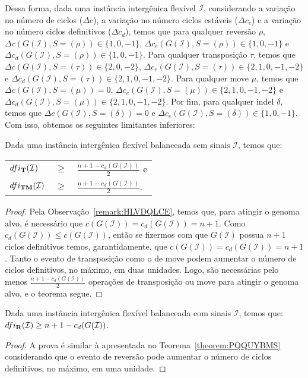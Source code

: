 Dessa forma, dada uma instância intergênica flexível $\mathcal{I}$, considerando a variação no número de ciclos ($\Delta c$), a variação no número ciclos estáveis ($\Delta c_e$) e a variação no número ciclos definitivos ($\Delta c_d$), temos que para qualquer reversão $\rho$, $\Delta c(G(\mathcal{I}), S=(\rho)) \in \{1,0,-1\}$, $\Delta c_e(G(\mathcal{I}), S=(\rho)) \in \{1,0,-1\}$ e $\Delta c_d(G(\mathcal{I}), S=(\rho)) \in \{1,0,-1\}$. Para qualquer transposição $\tau$, temos que $\Delta c(G(\mathcal{I}), S=(\tau)) \in \{2,0,-2\}$, $\Delta c_e(G(\mathcal{I}), S=(\tau)) \in \{2,1,0,-1,-2\}$ e $\Delta c_d(G(\mathcal{I}), S=(\tau)) \in \{2,1,0,-1,-2\}$. Para qualquer move $\mu$, temos que $\Delta c(G(\mathcal{I}), S=(\mu)) = 0$, $\Delta c_e(G(\mathcal{I}), S=(\mu)) \in \{2,1,0,-1,-2\}$ e $\Delta c_d(G(\mathcal{I}), S=(\mu)) \in \{2,1,0,-1,-2\}$. Por fim, para qualquer indel $\delta$, temos que $\Delta c(G(\mathcal{I}), S=(\delta)) = 0$ e $\Delta c_e(G(\mathcal{I}), S=(\delta)) \in \{1,0,{-1}\}$. Com isso, obtemos os seguintes limitantes inferiores:

\begin{theorem}\label{theorem:PQQUYBMS}
Dada uma instância intergênica flexível balanceada sem sinais $\mathcal{I}$, temos que:

\begin{tabular}{lll}
  $dfi_{\textbf{T}}(\mathcal{I})$      & $ \ge $ & $\frac{{n+1} - c_d(G(\mathcal{I} ))}{2}$ e \\
  $dfi_{\textbf{TM}}(\mathcal{I})$     & $ \ge $ & $\frac{{n+1} - c_d(G(\mathcal{I} ))}{2}$.  \\
\end{tabular}
\end{theorem}
\begin{proof}
Pela Observação~\ref{remark:HLVDQLCE}, temos que, para atingir o genoma alvo, é necessário que $c(G(\mathcal{I})) = c_d(G(\mathcal{I})) = n+1$. Como $c_d(G(\mathcal{I})) \le c(G(\mathcal{I}))$, então se fizermos com que $G(\mathcal{I})$ possua $n+1$ ciclos definitivos temos, garantidamente, que $c(G(\mathcal{I})) = c_d(G(\mathcal{I})) = n+1$. Tanto o evento de transposição como o de move podem aumentar o número de ciclos definitivos, no máximo, em duas unidades. Logo, são necessárias pelo menos $\frac{{n+1} - c_d(G(\mathcal{I} ))}{2}$ operações de transposição ou move para atingir o genoma alvo, e o teorema segue. 
\end{proof}

\begin{theorem}\label{theorem:EUNBEQEX}
Dada uma instância intergênica flexível balanceada com sinais $\mathcal{I}$, temos que: $dfi_{\textbf{R}}(\mathcal{I}) \ge {n+1} - c_d(G(\mathcal{I} ))$.
\end{theorem}
\begin{proof}
A prova é similar à apresentada no Teorema~\ref{theorem:PQQUYBMS} considerando que o evento de reversão pode aumentar o número de ciclos definitivos, no máximo, em uma unidade.
\end{proof}

